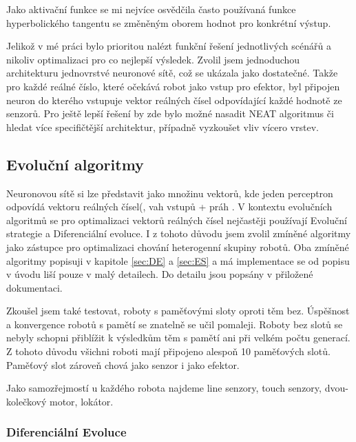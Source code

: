 \begin{center}
	\large{}
\end{center}
Jako aktivační funkce se mi nejvíce osvědčila často používaná funkce hyperbolického tangentu se změněným oborem hodnot pro konkrétní výstup. \par
{}Jelikož v mé práci bylo prioritou nalézt funkční řešení jednotlivých scénářů a nikoliv optimalizaci pro co nejlepší výsledek.  Zvolil jsem jednoduchou architekturu jednovrstvé neuronové sítě, což se ukázala jako dostatečné. Takže pro každé reálné číslo, které očekává robot jako vstup pro efektor, byl připojen neuron do kterého vstupuje vektor reálných čísel odpovídající každé hodnotě ze senzorů.  Pro ještě lepší řešení by zde bylo možné nasadit NEAT algoritmus či hledat více specifičtější architektur, případně vyzkoušet vliv vícero vrstev. 
\subsection{Evoluční algoritmy}
Neuronovou sítě si lze představit jako množinu vektorů, kde jeden perceptron odpovídá vektoru reálných čísel(, vah vstupů + práh . V kontextu evolučních algoritmů se pro optimalizaci vektorů reálných čísel nejčastěji používají Evoluční strategie a Diferenciální evoluce. I z tohoto důvodu jsem zvolil zmíněné algoritmy jako zástupce pro optimalizaci chování heterogenní skupiny robotů. Oba zmíněné algoritmy popisuji v kapitole \ref{sec:DE} a \ref{sec:ES} a má implementace se od popisu v úvodu liší pouze v malý detailech. Do detailu jsou popsány v přiložené dokumentaci. 
\par
{}
Zkoušel jsem také testovat, roboty s paměťovými sloty oproti těm bez. Úspěšnost a konvergence robotů s pamětí se znatelně se učil pomaleji. Roboty bez slotů se nebyly schopni přiblížit k výsledkům těm s pamětí ani při velkém počtu generací. Z tohoto důvodu všichni roboti mají připojeno alespoň 10 paměťových slotů. Paměťový slot zároveň chová jako senzor i jako efektor. 
\par 
Jako samozřejmostí u každého robota najdeme line senzory, touch senzory, dvou-kolečkový motor, lokátor. \par 

\subsubsection{Diferenciální Evoluce}

